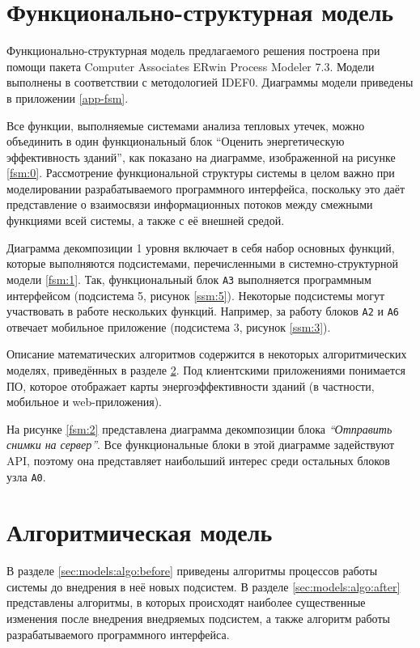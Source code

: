 \section{Функционально-структурная модель}

\par
	Функционально-структурная модель предлагаемого решения построена при помощи пакета {Computer Associates ERwin Process Modeler 7.3}. Модели выполнены в соответствии с методологией {IDEF0}. Диаграммы модели приведены в приложении \ref{app-fsm}.

	Все функции, выполняемые системами анализа тепловых утечек, можно объединить в один функциональный блок “Оценить энергетическую эффективность зданий”, как показано на диаграмме, изображенной на рисунке \ref{fsm:0}. Рассмотрение функциональной структуры системы в целом важно при моделировании разрабатываемого программного интерфейса, поскольку это даёт представление о взаимосвязи информационных потоков между смежными функциями всей системы, а также с её внешней средой.

\par
    Диаграмма декомпозиции 1 уровня включает в себя набор основных функций, которые выполняются подсистемами, перечисленными в системно-структурной модели \ref{fsm:1}. Так, функциональный блок \texttt{A3} выполняется программным интерфейсом (подсистема 5, рисунок \ref{ssm:5}). Некоторые подсистемы могут участвовать в работе нескольких функций. Например, за работу блоков \texttt{A2} и \texttt{A6} отвечает мобильное приложение (подсистема 3, рисунок \ref{ssm:3}).

	Описание математических алгоритмов содержится в некоторых алгоритмических моделях, приведённых в разделе \ref{sec:models:algo}. Под клиентскими приложениями понимается ПО, которое отображает карты энергоэффективности зданий (в частности, мобильное и web-приложения).

\par
    На рисунке \ref{fsm:2} представлена диаграмма декомпозиции блока \textit{“Отправить снимки на сервер”}. Все функциональные блоки в этой диаграмме задействуют API, поэтому она представляет наибольший интерес среди остальных блоков узла \texttt{A0}.

\section{Алгоритмическая модель}
\label{sec:models:algo}
	
\par
	В разделе \ref{sec:models:algo:before} приведены алгоритмы процессов работы системы до внедрения в неё новых подсистем. В разделе \ref{sec:models:algo:after} представлены алгоритмы, в которых происходят наиболее существенные изменения после внедрения внедряемых подсистем, а также алгоритм работы разрабатываемого программного интерфейса.

